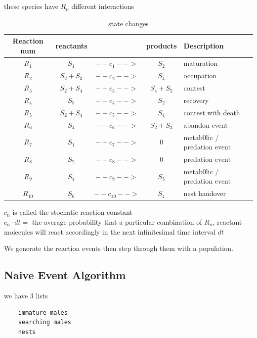 \documentclass[a4paper,11pt]{article}
\begin{document}
these species have $R_\mu$ different interactions
\begin{table}[h!]
    \caption{state changes}
    \centering
    \begin{tabular}{c | c | c | c | l }
        \hline
        Reaction num & reactants  & & products & Description\\
        \hline
        \hline
            $R_1$       &   $S_1$       & $--c_1-->$      &   $ S_2$      & maturation\\
            $R_2$       &   $S_2 + S_3$ & $--c_2-->$      &   $S_4 $      & occupation\\
            $R_3$       &   $S_2 + S_4$ & $--c_3-->$      &   $S_4 + S_5$ & contest\\
            $R_4$       &   $S_5$       & $--c_4-->$      &   $S_2$       & recovery\\
            $R_5$       &   $S_2 + S_4$ & $--c_5-->$      &   $S_4$       & contest with death\\
            $R_6$       &   $S_4$       & $--c_6-->$      &   $S_2 + S_3$ & abandon event\\
            $R_7$       &   $S_1$       & $--c_7-->$      &   $0$         & metab0lic / predation event\\
            $R_8$       &   $S_2$       & $--c_8-->$      &   $0$         & predation event\\
            $R_9$       &   $S_4$       & $--c_9-->$      &   $S_3$       & metab0lic / predation event\\
            $R_{10}$    &   $S_6$       & $--c_{10}-->$   &   $S_4$       & nest handover\\
        \hline
    \end{tabular}

\end{table}

$c_n$ is called the stochatic reaction constant\\
$c_n \cdot dt = $ the average probability that a particular combination of $R_n$, reactant molecules will react accordingly in the next infinitesimal time interval $dt$


\citep{Gillespie-1976}

We generate the reaction events then step through them with a population.
\clearpage
\subsection{Naive Event Algorithm}
we have 3 lists
\begin{verbatim}
    immature males
    searching males
    nests
\end{verbatim}
\end{document}
